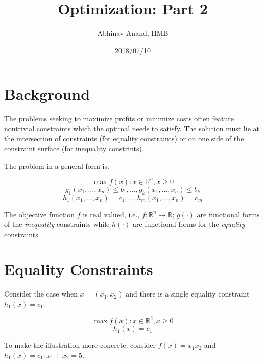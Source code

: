 \documentclass[11pt,]{article}
\title{Optimization: Part 2}
\author{Abhinav Anand, IIMB}
\date{2018/07/10}
\begin{document}
\maketitle

\section{Background}\label{background}

The problems seeking to maximize profits or minimize costs often feature
nontrivial constraints which the optimal needs to satisfy. The solution
must lie at the intersection of constraints (for equality constraints)
or on one side of the constraint surface (for inequality constrints).

The problem in a general form is:

\[
\max f(x): x\in \mathbb{R}^n, x\geq 0
\] \[
g_1(x_1,\hdots,x_n)\leq b_1,\hdots,g_k(x_1,\hdots,x_n)\leq b_k
\] \[
h_1(x_1,\hdots,x_n)= c_1,\hdots,h_m(x_1,\hdots,x_n)= c_m
\]

The objective function \(f\) is real valued, i.e.,
\(f:\mathbb{R}^n \to \mathbb{R}\); \(g(\cdot)\) are functional forms of
the \emph{inequality} constraints while \(h(\cdot)\) are functional
forms for the \emph{equality} constraints.

\section{Equality Constraints}\label{equality-constraints}

Consider the case when \(x=(x_1, x_2)\) and there is a single equality
constraint \(h_1(x) = c_1\).

\[
\max f(x): x\in \mathbb{R}^2, x\geq 0
\] \[
h_1(x) = c_1
\]

To make the illustration more concrete, consider \(f(x) = x_1x_2\) and
\(h_1(x)=c_1:x_1+ x_2=5\).
\end{document}
